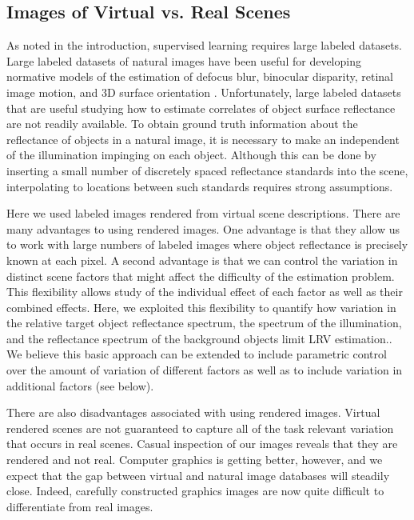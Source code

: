 \documentclass{jov}
\begin{document}
\subsection{Images of Virtual vs. Real Scenes}
As noted in the introduction, supervised learning requires large labeled datasets. Large labeled datasets of natural images have been useful for developing normative models of the estimation of defocus blur, binocular disparity, retinal image motion, and 3D surface orientation \cite{burge2011optimal, burge2012optimal, burge2014optimal, burge2015optimal, kim2018lawful}. 
Unfortunately, large labeled datasets that are useful studying how to estimate correlates of object surface reflectance are not readily available.
To obtain ground truth information about the reflectance of objects in a natural image, it is necessary to make an independent of the illumination impinging on each object.
Although this can be done by inserting a small number of discretely spaced reflectance standards into the scene, 
interpolating to locations between such standards requires strong assumptions.

Here we used labeled images rendered from virtual scene descriptions. 
There are many advantages to using rendered images.
One advantage is that they allow us to work with large numbers of labeled images where object reflectance is precisely known at each pixel.
A second advantage is that we can control the variation in distinct scene factors that might affect the difficulty of the estimation problem.
This flexibility allows study of the individual effect of each factor as well as their combined effects.
Here, we exploited this flexibility to quantify how variation in the relative target object reflectance
spectrum, the spectrum of the illumination, and the reflectance spectrum of the background objects limit LRV estimation..
We believe this basic approach can be extended to include parametric control over the amount of variation of different factors as well as to include variation in additional factors (see below).

There are also disadvantages associated with using rendered images. 
Virtual rendered scenes are not guaranteed to capture all of the task relevant variation that occurs in real scenes.
Casual inspection of our images reveals that they are rendered and not real.
Computer graphics is getting better, however, and we expect that the gap between virtual and natural image databases will steadily close.
Indeed, carefully constructed graphics images are now quite difficult to differentiate from real images.
\end{document}
